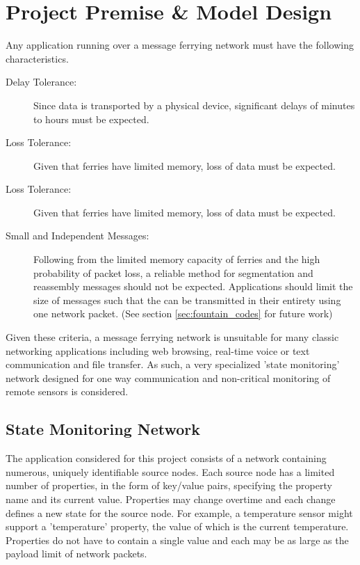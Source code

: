 \chapter{Project Premise \& Model Design} 


Any application running over a message ferrying network must have the following characteristics.

\begin{description}
\item[Delay Tolerance: ]
Since data is transported by a physical device, significant delays of minutes to hours must be expected.
\item[Loss Tolerance: ]
Given that ferries have limited memory, loss of data must be expected.
\item[Loss Tolerance: ]
Given that ferries have limited memory, loss of data must be expected.
\item[Small and Independent Messages: ]
Following from the limited memory capacity of ferries and the high probability of packet loss, a reliable method for segmentation and reassembly messages should not be expected. 
Applications should limit the size of messages such that the can be transmitted in their entirety using one network packet.
(See section \ref{sec:fountain_codes} for future work)
\end{description}

Given these criteria, a message ferrying network is unsuitable for many classic networking applications including web browsing, real-time voice or text communication and file transfer.
As such, a very specialized 'state monitoring' network designed for one way communication and non-critical monitoring of remote sensors is considered.

\section{State Monitoring Network}

The application considered for this project consists of a network containing numerous, uniquely identifiable source nodes. 
Each source node has a limited number of properties, in the form of key/value pairs, specifying the property name and its current value.
Properties may change overtime and each change defines a new state for the source node.
For example, a temperature sensor might support a 'temperature' property, the value of which is the current temperature.
Properties do not have to contain a single value and each may be as large as the payload limit of network packets. %


